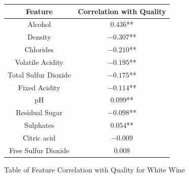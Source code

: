   \begin{figure}[htb]
  \centering %

 \begin{tabular}{|c|c|} 
   \hline \hline %
    Feature & Correlation with Quality \\ %
    \hline %
    Alcohol & $0.436$** \\
     \hline
    Density & $-0.307$** \\
     \hline
    Chlorides & $-0.210$** \\
     \hline
    Volatile Acidity   & $-0.195$** \\
     \hline
    Total Sulfur Dioxide  & $-0.175$** \\
     \hline
    Fixed Acidity  & $-0.114$** \\
     \hline
    pH & $0.099$** \\
     \hline
    Residual Sugar & $-0.098$** \\
     \hline
    Sulphates  & $0.054$** \\
     \hline
    Citric acid   & $-0.009$ \\
     \hline
    Free Sulfur Dioxide  & $0.008$ \\
  
    \hline \hline  
    \end{tabular}
  \caption{Table of Feature Correlation with Quality for White Wine}
  \label{tab:example}


\end{figure}


